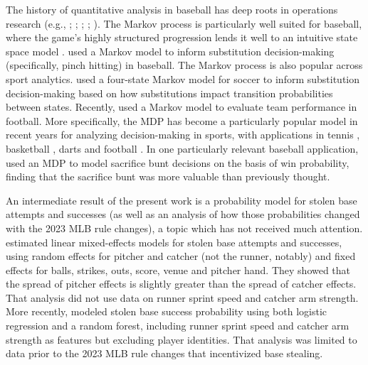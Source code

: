 \documentclass[11pt]{article}
\begin{document}
    The history of quantitative analysis in baseball has deep roots in operations research (e.g., \cite{lindsey_investigation_1963}; \cite{freeze_analysis_1974}; \cite{pankin_evaluating_1978}; \cite{russell_devising_1994}; \cite{bukiet_markov_1997}). The Markov process is particularly well suited for baseball, where the game's highly structured progression lends it well to an intuitive state space model \parencite{sokol_intuitive_2004}. \textcite{hirotsu_markov_2003} used a Markov model to inform substitution decision-making (specifically, pinch hitting) in baseball. The Markov process is also popular across sport analytics. \textcite{hirotsu_using_2002} used a four-state Markov model for soccer to inform substitution decision-making based on how substitutions impact transition probabilities between states. Recently, \textcite{chan_points_2021} used a Markov model to evaluate team performance in football. More specifically, the MDP has become a particularly popular model in recent years for analyzing decision-making in sports, with applications in tennis \parencite{nadimpalli_when_2013}, basketball \parencite{sandholtz_markov_2020}, darts \parencite{baird_optimising_2020} and football \parencite{biro_reinforcement_2022}. In one particularly relevant baseball application, \textcite{hirotsu_using_2019} used an MDP to model sacrifice bunt decisions on the basis of win probability, finding that the sacrifice bunt was more valuable than previously thought.

    An intermediate result of the present work is a probability model for stolen base attempts and successes (as well as an analysis of how those probabilities changed with the 2023 MLB rule changes), a topic which has not received much attention. \textcite{loughin_assessing_2008} estimated linear mixed-effects models for stolen base attempts and successes, using random effects for pitcher and catcher (not the runner, notably) and fixed effects for balls, strikes, outs, score, venue and pitcher hand. They showed that the spread of pitcher effects is slightly greater than the spread of catcher effects. That analysis did not use data on runner sprint speed and catcher arm strength. More recently, \textcite{stanley_modeling_2023} modeled stolen base success probability using both logistic regression and a random forest, including runner sprint speed and catcher arm strength as features but excluding player identities. That analysis was limited to data prior to the 2023 MLB rule changes that incentivized base stealing.
   
\end{document}

